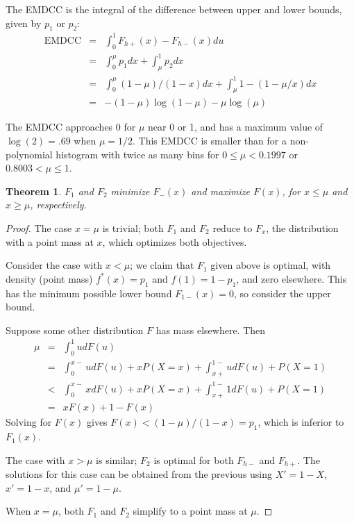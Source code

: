\documentclass{article}
\newcommand{\Fmin}{F_{h-}}
\newcommand{\Fmax}{F_{h+}}
\newtheorem{theorem}{Theorem}
\begin{document}
The EMDCC is the integral of the difference between upper and lower
bounds, given by $p_1$ or $p_2$:
\begin{eqnarray}
  \mbox{EMDCC}
  &=& \int_0^1 \Fmax(x) - \Fmin(x) du \nonumber \\
  &=& \int_0^\mu p_1 dx + \int_\mu^1 p_2 dx \nonumber \\
  &=& \int_0^\mu (1-\mu)/(1-x)dx + \int_\mu^1 1 - (1 - \mu/x) dx \nonumber \\
  &=& -(1-\mu) \log(1-\mu) - \mu \log(\mu)
\end{eqnarray}



The EMDCC approaches 0 for $\mu$ near 0 or 1, and has a maximum value
of $\log(2) = .69$ when $\mu = 1/2$. This EMDCC is smaller than for
a non-polynomial histogram with twice as many bins
for $0 \le \mu < 0.1997$ or $0.8003 < \mu \le 1$.

\begin{theorem}
$F_1$ and $F_2$ minimize $F_{-}(x)$ and maximize $F(x)$,
for $x \le \mu$ and $x \ge \mu$, respectively.
\end{theorem}

\begin{proof}
The case $x = \mu$ is trivial; both $F_1$ and $F_2$ reduce to
$F_x$, the distribution with a point mass at $x$, which optimizes
both objectives.

Consider the case with $x < \mu$; we claim that $F_1$ given above is optimal,
with density (point mass) $f^*(x) = p_1$
and $f(1) = 1-p_1$, and zero elsewhere.
This has the minimum possible lower bound $F_{1-}(x) = 0$,
so consider the upper bound.

Suppose some other distribution $F$ has mass elsewhere.
Then
\begin{eqnarray}
  \mu
  &=& \int_0^1 u dF(u) \\
  &=& \int_0^{x-} u dF(u) + x P(X=x) + \int_{x+}^{1-} u dF(u) + P(X=1) \\
  &<& \int_0^{x-} x dF(u) + x P(X=x) + \int_{x+}^{1-} 1 dF(u) + P(X=1) \\
  &=& x F(x) + 1 - F(x)
\end{eqnarray}
Solving for $F(x)$ gives $F(x) < (1-\mu) / (1-x) = p_1$,
which is inferior to $F_1(x)$.

The case with $x > \mu$ is similar; $F_2$ is optimal for both
$\Fmin$ and $\Fmax$.
The solutions for this case can be obtained from the previous using
$X' = 1-X$,
$x' = 1-x$, and
$\mu' = 1 - \mu$.

When $x = \mu$, both $F_1$ and $F_2$ simplify to a point mass at $\mu$.
\end{proof}
\end{document}
